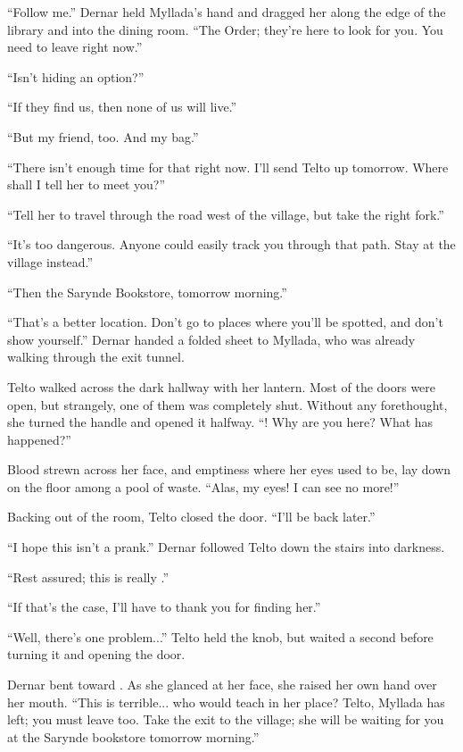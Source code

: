 ``Follow me.'' Dernar held Myllada's hand and dragged her along the edge of the library and into the dining room. ``The Order; they're here to look for you. You need to leave right now.''

``Isn't hiding an option?''

``If they find us, then none of us will live.''

``But my friend, too. And my bag.''

``There isn't enough time for that right now. I'll send Telto up tomorrow. Where shall I tell her to meet you?''

``Tell her to travel through the road west of the village, but take the right fork.''

``It's too dangerous. Anyone could easily track you through that path. Stay at the village instead.''

``Then the Sarynde Bookstore, tomorrow morning.''

``That's a better location. Don't go to places where you'll be spotted, and don't show yourself.'' Dernar handed a folded sheet to Myllada, who was already walking through the exit tunnel.

\centeredstars

Telto walked across the dark hallway with her lantern. Most of the doors were open, but strangely, one of them was completely shut. Without any forethought, she turned the handle and opened it halfway. ``\yronsyncra! Why are you here? What has happened?''

Blood strewn across her face, and emptiness where her eyes used to be, \yronsyncra{} lay down on the floor among a pool of waste. ``Alas, my eyes! I can see no more!''

Backing out of the room, Telto closed the door. ``I'll be back later.''

\centeredstars

``I hope this isn't a prank.'' Dernar followed Telto down the stairs into darkness.

``Rest assured; this is really \yronsyncra.''

``If that's the case, I'll have to thank you for finding her.''

``Well, there's one problem...'' Telto held the knob, but waited a second before turning it and opening the door.

Dernar bent toward \yronsyncra. As she glanced at her face, she raised her own hand over her mouth. ``This is terrible... who would teach in her place? Telto, Myllada has left; you must leave too. Take the exit to the village; she will be waiting for you at the Sarynde bookstore tomorrow morning.''

